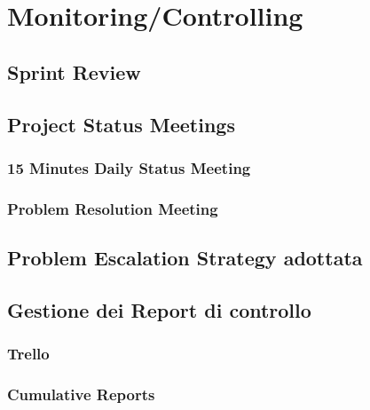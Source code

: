 \chapter{Monitoring/Controlling}

\section{Sprint Review}

\section{Project Status Meetings}

\subsection{15 Minutes Daily Status Meeting}

\subsection{Problem Resolution Meeting}

\section{Problem Escalation Strategy adottata}

\section{Gestione dei Report di controllo}

\subsection{Trello}

\subsection{Cumulative Reports}
